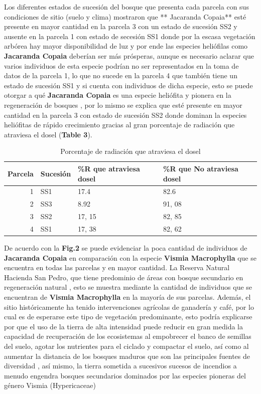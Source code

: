\documentclass[letterpaper,9pt,twocolumn,twoside,]{pinp}
\begin{document}
Los diferentes estados de sucesión del bosque que presenta cada parcela
con sus condiciones de sitio (suelo y clima) mostraron que ** Jacaranda
Copaia** esté presente en mayor cantidad en la parcela 3 con un estado
de sucesión SS2 y ausente en la parcela 1 con estado de secesión SS1
donde por la escasa vegetación arbórea hay mayor disponibilidad de luz y
por ende las especies heliófilas como \textbf{Jacaranda Copaia} deberían
ser más prósperas, aunque es necesario aclarar que varios individuos de
esta especie podrían no ser representados en la toma de datos de la
parcela 1, lo que no sucede en la parcela 4 que también tiene un estado
de sucesión SS1 y si cuenta con individuos de dicha especie, esto se
puede otorgar a qué \textbf{Jacaranda Copaia} es una especie heliófita y
pionera en la regeneración de bosques \citep{tapia}, por lo mismo se
explica que esté presente en mayor cantidad en la parcela 3 con estado
de sucesión SS2 donde dominan la especies heliófitas de rápido
crecimiento gracias al gran porcentaje de radiación que atraviesa el
dosel (\textbf{Table 3}).

\begin{table}

\caption{\label{tab:unnamed-chunk-7}Porcentaje de radiación que atraviesa el dosel}
\centering
\begin{tabular}[t]{r|l|l|l}
\hline
Parcela & Sucesión & \%R que atraviesa dosel & \%R que No atraviesa dosel\\
\hline
1 & SS1 & 17.4 & 82.6\\
\hline
2 & SS3 & 8.92 & 91, 08\\
\hline
3 & SS2 & 17, 15 & 82, 85\\
\hline
4 & SS1 & 17, 38 & 82, 62\\
\hline
\end{tabular}
\end{table}

De acuerdo con la \textbf{Fig.2} se puede evidenciar la poca cantidad de
individuos de \textbf{Jacaranda Copaia} en comparación con la especie
\textbf{Vismia Macrophylla} que se encuentra en todas las parcelas y en
mayor cantidad. La Reserva Natural Hacienda San Pedro, que tiene
predominio de áreas con bosque secundario en regeneración natural
\citep{sala}, esto se muestra mediante la cantidad de individuos que se
encuentran de \textbf{Vismia Macrophylla} en la mayoría de sus parcelas.
Además, el sitio históricamente ha tenido intervenciones agrícolas de
ganadería y café, por lo cual es de esperarse este tipo de vegetación
predominante, esto podría explicarse por que el uso de la tierra de alta
intensidad puede reducir en gran medida la capacidad de recuperación de
los ecosistemas al empobrecer el banco de semillas del suelo, agotar los
nutrientes para el ciclado y compactar el suelo, así como al aumentar la
distancia de los bosques maduros que son las principales fuentes de
diversidad \citep{grubb, hooper, pic}, así mismo, la tierra sometida a
sucesivos sucesos de incendios a menudo engendra bosques secundarios
dominados por las especies pioneras del género Vismia (Hypericaceae)
\citep{jak}
\end{document}
